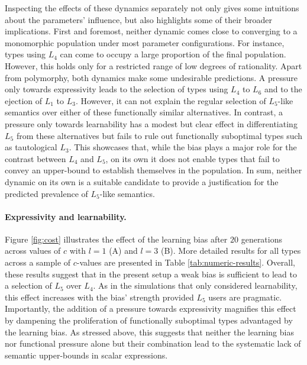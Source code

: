 \documentclass[a4paper]{article}
\begin{document}
Inspecting the effects of these dynamics separately not only gives some intuitions about the parameters' influence, but also highlights some of their broader implications. First and foremost, neither dynamic comes close to converging to a monomorphic population under most parameter configurations. For instance, types using $L_4$ can come to occupy a large proportion of the final population. However, this holds only for a restricted range of low degrees of rationality. Apart from polymorphy, both dynamics make some undesirable predictions. A pressure only towards expressivity leads to the selection of types using $L_4$ to $L_6$ and to the ejection of $L_1$ to $L_3$. However, it can not explain the regular selection of $L_5$-like semantics over either of these functionally similar alternatives. In contrast, a pressure only towards learnability has a modest but clear effect in differentiating $L_5$ from these alternatives but fails to rule out functionally suboptimal types such as tautological $L_3$. This showcases that, while the bias plays a major role for the contrast between $L_4$ and $L_5$, on its own it does not enable types that fail to convey an upper-bound to establish themselves in the population. In sum, neither dynamic on its own is a suitable candidate to provide a justification for the predicted prevalence of $L_5$-like semantics. 

\paragraph{Expressivity and learnability.} Figure \ref{fig:cost} illustrates the effect of the learning bias after $20$ generations across values of $c$ with $l = 1$ (A) and $l =3$ (B). More detailed results for all types across a sample of $c$-values are presented in Table \ref{tab:numeric-results}. Overall, these results suggest that in the present setup a weak bias is sufficient to lead to a selection of $L_5$ over $L_4$. As in the simulations that only considered learnability, this effect increases with the bias' strength provided $L_5$ users are pragmatic. Importantly, the addition of a pressure towards expressivity magnifies this effect by dampening the proliferation of functionally suboptimal types advantaged by the learning bias. As stressed above, this suggests that neither the learning bias nor functional pressure alone but their combination lead to the systematic lack of semantic upper-bounds in scalar expressions.
\end{document}
